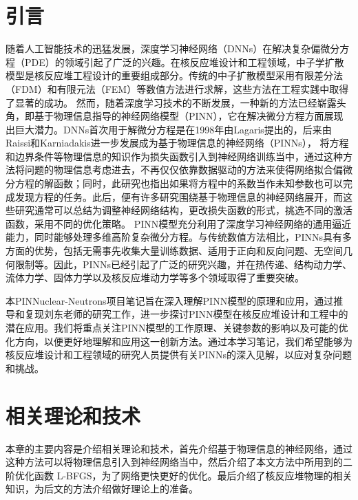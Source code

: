 \documentclass{Sichuan Normal University}
\begin{document}


\maketitle
\section*{引言}
随着人工智能技术的迅猛发展，深度学习神经网络（DNNs）在解决复杂偏微分方程（PDE）的领域引起了广泛的兴趣。在核反应堆设计和工程领域，中子学扩散模型是核反应堆工程设计的重要组成部分。传统的中子扩散模型采用有限差分法（FDM）和有限元法（FEM）等数值方法进行求解，这些方法在工程实践中取得了显著的成功。
然而，随着深度学习技术的不断发展，一种新的方法已经崭露头角，即基于物理信息指导的神经网络模型（PINN），它在解决微分方程方面展现出巨大潜力。DNNs首次用于解微分方程是在1998年由Lagaris提出的\cite{lagarisArtificialNeuralNetworks1998}，后来由Raissi和Karniadakis进一步发展成为基于物理信息的神经网络（PINNs）\cite{raissiPhysicsinformedNeuralNetworks2019}，
将方程和边界条件等物理信息的知识作为损失函数引入到神经网络训练当中，通过这种方法将问题的物理信息考虑进去，不再仅仅依靠数据驱动的方法来使得网络拟合偏微分方程的解函数；同时，此研究也指出如果将方程中的系数当作未知参数也可以完成发现方程的任务。此后，便有许多研究围绕基于物理信息的神经网络展开，而这些研究通常可以总结为调整神经网络结构，更改损失函数的形式，挑选不同的激活函数，采用不同的优化策略。
PINN模型充分利用了深度学习神经网络的通用逼近能力，同时能够处理多维高阶复杂微分方程。与传统数值方法相比，PINNs具有多方面的优势，包括无需事先收集大量训练数据、适用于正向和反向问题、无空间几何限制等。因此，PINNs已经引起了广泛的研究兴趣，并在热传递、结构动力学、流体力学、固体力学以及核反应堆动力学等多个领域取得了重要突破。

本PINNuclear-Neutrons项目笔记旨在深入理解PINN模型的原理和应用，通过推导和复现刘东老师的研究工作\cite{LiuDongJiYuPINNShenDuJiQiXueXiJiShuQiuJieDuoWeiZhongZiXueKuoSanFangCheng2022}，进一步探讨PINN模型在核反应堆设计和工程中的潜在应用。我们将重点关注PINN模型的工作原理、关键参数的影响以及可能的优化方向，以便更好地理解和应用这一创新方法。通过本学习笔记，我们希望能够为核反应堆设计和工程领域的研究人员提供有关PINNs的深入见解，以应对复杂问题和挑战。


\section{相关理论和技术}
本章的主要内容是介绍相关理论和技术，首先介绍基于物理信息的神经网络，通过这种方法可以将物理信息引入到神经网络当中，然后介绍了本文方法中所用到的二阶优化函数 L-BFGS，为了网络更快更好的优化。最后介绍了核反应堆物理的相关知识，为后文的方法介绍做好理论上的准备。
\end{document}

